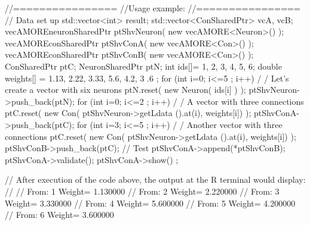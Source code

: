\begin{DoxyCode}
        //================
        //Usage example:
        //================
        // Data set up
                                std::vector<int> result;
                                std::vector<ConSharedPtr> vcA, vcB;
                                vecAMOREneuronSharedPtr ptShvNeuron( new 
      vecAMORE<Neuron>() );
                                vecAMOREconSharedPtr    ptShvConA( new 
      vecAMORE<Con>() );
                                vecAMOREconSharedPtr    ptShvConB( new 
      vecAMORE<Con>() );
                                ConSharedPtr    ptC;
                                NeuronSharedPtr ptN;
                                int ids[]= {1, 2, 3, 4, 5, 6};
                                double weights[] = {1.13, 2.22, 3.33, 5.6, 4.2, 3
      .6 };
                                for (int i=0; i<=5 ; i++) {                             /
      / Let's create a vector with six neurons
                                        ptN.reset( new Neuron( ids[i] ) );
                                        ptShvNeuron->push_back(ptN);
                                }
                                for (int i=0; i<=2 ; i++) {                             /
      / A vector with three connections
                                        ptC.reset( new Con( ptShvNeuron->getLdata
      ().at(i), weights[i]) );
                                        ptShvConA->push_back(ptC);
                                }
                                for (int i=3; i<=5 ; i++) {                             /
      / Another vector with three connections
                                        ptC.reset( new Con( ptShvNeuron->getLdata
      ().at(i), weights[i]) );
                                        ptShvConB->push_back(ptC);
                                }
        // Test
                                ptShvConA->append(*ptShvConB);
                                ptShvConA->validate();
                                ptShvConA->show() ;

        // After execution of the code above, the output at the R terminal would 
      display:
        //
        //  From:        1       Weight=         1.130000
        //      From:    2       Weight=         2.220000
        //      From:    3       Weight=         3.330000
        //      From:    4       Weight=         5.600000
        //      From:    5       Weight=         4.200000
        //      From:    6       Weight=         3.600000
\end{DoxyCode}


